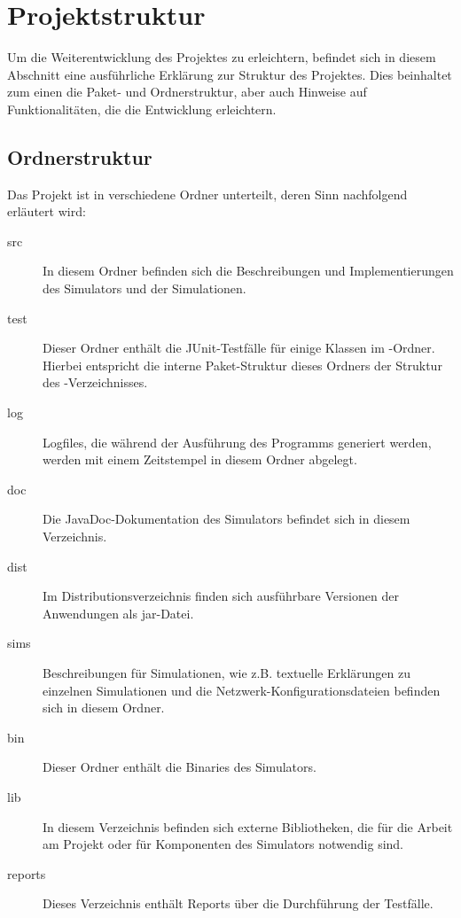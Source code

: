 \section{Projektstruktur}\label{sec:appendix_structure}
Um die Weiterentwicklung des Projektes zu erleichtern, befindet sich in diesem Abschnitt eine ausführliche Erklärung zur Struktur des Projektes. Dies beinhaltet zum einen die Paket- und Ordnerstruktur, aber auch Hinweise auf Funktionalitäten, die die Entwicklung erleichtern.
\subsection{Ordnerstruktur}
Das Projekt ist in verschiedene Ordner unterteilt, deren Sinn nachfolgend erläutert wird:
\begin{description}
	\item[src] In diesem Ordner befinden sich die Beschreibungen und Implementierungen des Simulators und der Simulationen.
	\item[test] Dieser Ordner enthält die JUnit-Testfälle für einige Klassen im -Ordner. Hierbei entspricht die interne Paket-Struktur dieses Ordners der Struktur des -Verzeichnisses.
	\item[log] Logfiles, die während der Ausführung des Programms generiert werden, werden mit einem Zeitstempel in diesem Ordner abgelegt.
	\item[doc] Die JavaDoc-Dokumentation des Simulators befindet sich in diesem Verzeichnis.
	\item[dist] Im Distributionsverzeichnis finden sich ausführbare Versionen der Anwendungen als jar-Datei.
	\item[sims] Beschreibungen für Simulationen, wie z.B. textuelle Erklärungen zu einzelnen Simulationen und die Netzwerk-Konfigurationsdateien befinden sich in diesem Ordner.
	\item[bin] Dieser Ordner enthält die Binaries des Simulators.
	\item[lib] In diesem Verzeichnis befinden sich externe Bibliotheken, die für die Arbeit am Projekt oder für Komponenten des Simulators notwendig sind.
	\item[reports] Dieses Verzeichnis enthält Reports über die Durchführung der Testfälle.
\end{description}
